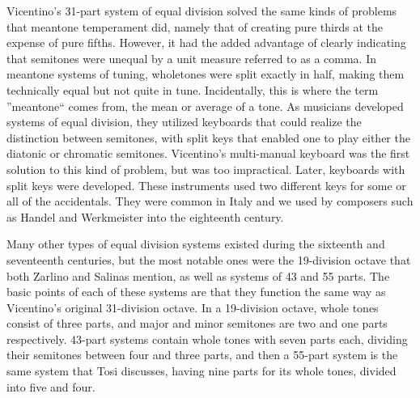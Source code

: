 Vicentino's 31-part system of equal division solved the same kinds of problems that meantone temperament
did, namely that of creating pure thirds at the expense of pure fifths.
However, it had the added advantage of clearly indicating that semitones were
unequal by a unit measure referred to as a comma.  In meantone systems of tuning, wholetones were
split exactly in half, making them technically equal but not quite in tune.  Incidentally, this
is where the term ''meantone`` comes from, the mean or average of a tone.  As musicians developed
systems of equal division, they utilized keyboards that could realize the distinction between
semitones, with split keys that
enabled one to play either the diatonic or chromatic semitones.  Vicentino's
multi-manual keyboard was the first solution to this kind of problem,
but was too impractical.  Later, keyboards with split keys were developed.  These instruments used
two different keys for some or all of the accidentals.  They were common in Italy and we used
by composers such as Handel and Werkmeister into the eighteenth century.
\autocite[108]{MB:1}

Many other types of equal division systems existed during the sixteenth
and seventeenth centuries, but the most notable ones were the 19-division
octave that both Zarlino and Salinas mention, as
well as systems of 43 and 55 parts.  The basic points of each of these
systems are that they function the same way as Vicentino's original 31-division octave.
In a 19-division octave, whole tones consist of
three parts, and major and minor semitones are two and one parts
respectively.  43-part systems contain whole tones with seven parts each,
dividing their semitones between four and three parts, and then a 55-part
system is the same system that Tosi discusses, having nine parts for its whole tones, divided into
five and four.
 \begin{table}[h!]
    \begin{center}
    \end{center}
    \caption{Comparison of systems of equal division}
    \label{table:equalDivision}
\end{table}

